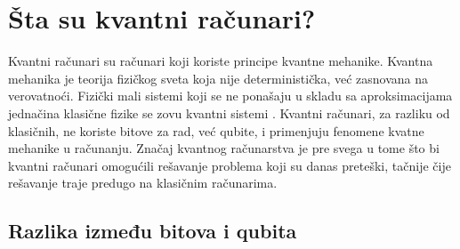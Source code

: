 \documentclass[fleqn, 12pt]{article}
\begin{document}


\setcounter{tocdepth}{2}
\tableofcontents

\newpage

\section{Šta su kvantni računari?}

\begin{text}
Kvantni računari su računari koji koriste principe kvantne mehanike. Kvantna mehanika je teorija fizičkog sveta koja nije deterministička, već zasnovana na verovatnoći. Fizički mali sistemi koji se ne ponašaju u skladu sa aproksimacijama jednačina klasične fizike se zovu kvantni sistemi \cite{G1}. Kvantni računari, za razliku od klasičnih, ne koriste bitove za rad, već qubite, i primenjuju fenomene kvatne mehanike u računanju. Značaj kvantnog računarstva je pre svega u tome što bi kvantni računari omogućili rešavanje problema koji su danas preteški, tačnije čije rešavanje traje predugo na klasičnim računarima.
\end{text}

\subsection{Razlika između bitova i qubita}
\end{document}
